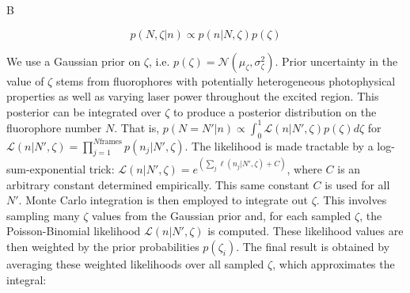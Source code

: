B%




\begin{equation}
p(N,\zeta\lvert n) \propto p(n\lvert N,\zeta)p(\zeta)
\end{equation}

We use a Gaussian prior on $\zeta$, i.e. $p(\zeta) = \mathcal{N}(\mu_{\zeta},\sigma_{\zeta}^2)$. Prior uncertainty in the value of $\zeta$ stems from fluorophores with potentially heterogeneous photophysical properties as well as varying laser power throughout the excited region. This posterior can be integrated over $\zeta$ to produce a posterior distribution on the fluorophore number $N$. That is, $p(N=N'\lvert n) \propto \int_{0}^{1} \mathcal{L}(n\lvert N',\zeta)p(\zeta) d\zeta$ for $\mathcal{L}(n\lvert N',\zeta)=\prod_{j=1}^{N\mathrm{frames}} p(n_{j}\lvert N',\zeta)$. The likelihood is made tractable by a log-sum-exponential trick: $\mathcal{L}(n\lvert N',\zeta) = e^{\left(\sum_{j}\ell (n_{j}\lvert N',\zeta) + C\right)}$, where $C$ is an arbitrary constant determined empirically. This same constant $C$ is used for all $N'$. Monte Carlo integration is then employed to integrate out $\zeta$. This involves sampling many $\zeta$ values from the Gaussian prior and, for each sampled $\zeta$, the Poisson-Binomial likelihood $\mathcal{L}(n\lvert N',\zeta)$ is computed. These likelihood values are then weighted by the prior probabilities $p(\zeta_i)$. The final result is obtained by averaging these weighted likelihoods over all sampled $\zeta$, which approximates the integral:


